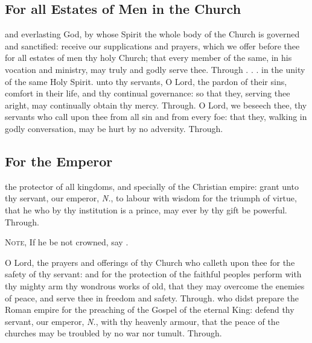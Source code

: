 \begin{multicols}{2}
\subsection{For all Estates of Men in the Church}
\collect
{} and everlasting God, by whose Spirit the whole body of the Church is governed and sanctified: receive our supplications and prayers, which we offer before thee for all estates of men thy holy Church; that every member of the same, in his vocation and ministry, may truly and godly serve thee. Through . . . in the unity of the same Holy Spirit.
\secret
{} unto thy servants, O Lord, the pardon of their sins, comfort in their life, and thy continual governance: so that they, serving thee aright, may continually obtain thy mercy. Through.
\postcommunion
{} O Lord, we beseech thee, thy servants who call upon thee from all sin and from every foe: that they, walking in godly conversation, may be hurt by no adversity. Through.


   \newcolumn

\subsection{For the Emperor}
\collect
{} the protector of all kingdoms, and specially of the Christian empire: grant unto thy servant, our emperor, \textit{N.}, to labour with wisdom for the triumph of virtue, that he who by thy institution is a prince, may ever by thy gift be powerful. Through.
\begin{rubric}
    \textsc{Note,} If he be not crowned, say .
\end{rubric}

\secret
{} O Lord, the prayers and offerings of thy Church who calleth upon thee for the safety of thy servant: and for the protection of the faithful peoples perform with thy mighty arm thy wondrous works of old, that they may overcome the enemies of peace, and serve thee in freedom and safety. Through.
\postcommunion
{} who didst prepare the Roman empire for the preaching of the Gospel of the eternal King: defend thy servant, our emperor, \textit{N.}, with thy heavenly armour, that the peace of the churches may be troubled by no war nor tumult. Through.

   \newcolumn


\end{multicols}
